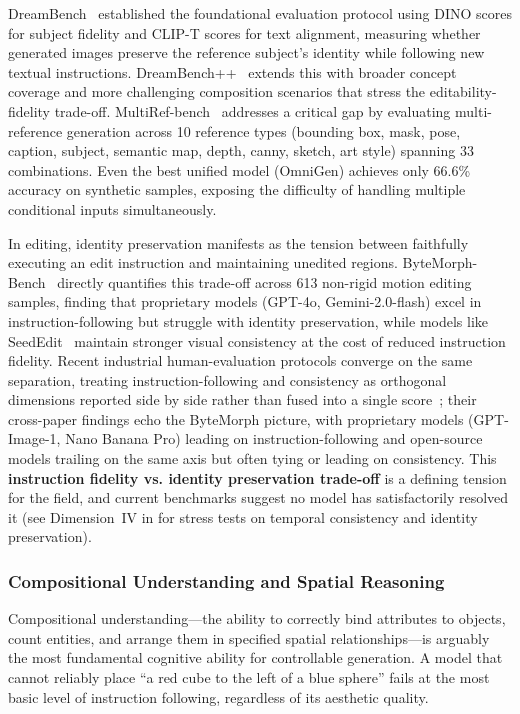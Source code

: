 DreamBench~\citep{ruiz2023dreambooth} established the foundational evaluation protocol using DINO scores for subject fidelity and CLIP-T scores for text alignment, measuring whether generated images preserve the reference subject's identity while following new textual instructions. DreamBench++~\citep{peng2024dreambench++} extends this with broader concept coverage and more challenging composition scenarios that stress the editability-fidelity trade-off. MultiRef-bench~\citep{MultiRef} addresses a critical gap by evaluating multi-reference generation across 10 reference types (bounding box, mask, pose, caption, subject, semantic map, depth, canny, sketch, art style) spanning 33 combinations. Even the best unified model (OmniGen) achieves only 66.6\% accuracy on synthetic samples, exposing the difficulty of handling multiple conditional inputs simultaneously.

In editing, identity preservation manifests as the tension between faithfully executing an edit instruction and maintaining unedited regions. ByteMorph-Bench~\citep{ByteMorph} directly quantifies this trade-off across 613 non-rigid motion editing samples, finding that proprietary models (GPT-4o, Gemini-2.0-flash) excel in instruction-following but struggle with identity preservation, while models like SeedEdit~\citep{wang2025seededit} maintain stronger visual consistency at the cost of reduced instruction fidelity. Recent industrial human-evaluation protocols converge on the same separation, treating instruction-following and consistency as orthogonal dimensions reported side by side rather than fused into a single score~\citep{seedream2025seedream, team2025longcat, team2026firered, mao2026wan}; their cross-paper findings echo the ByteMorph picture, with proprietary models (GPT-Image-1, Nano Banana Pro) leading on instruction-following and open-source models trailing on the same axis but often tying or leading on consistency. This \textbf{instruction fidelity vs. identity preservation trade-off} is a defining tension for the field, and current benchmarks suggest no model has satisfactorily resolved it (see Dimension~IV in  for stress tests on temporal consistency and identity preservation).


\subsubsection{Compositional Understanding and Spatial Reasoning}

Compositional understanding---the ability to correctly bind attributes to objects, count entities, and arrange them in specified spatial relationships---is arguably the most fundamental cognitive ability for controllable generation. A model that cannot reliably place ``a red cube to the left of a blue sphere'' fails at the most basic level of instruction following, regardless of its aesthetic quality.

